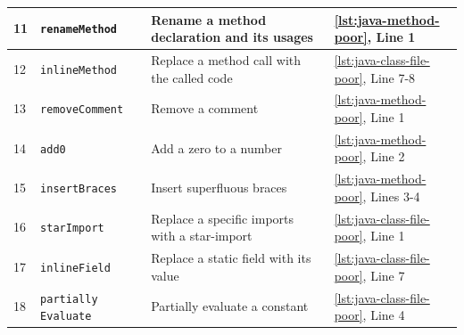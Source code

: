 \documentclass[%
class=scrreprt,
chapterprefix=false,%
open=right,%
twoside=true,%
paper=a4,%
logofile={Logo\_zentral\_farbig\_EN.png},%
thesistype=master,%
UKenglish,%
]{se2thesis}
\theoremstyle{definition}
\begin{document}
\begin{table}[p]
\begin{tabular}{|p{}|p{}|p{}|p{}|}
			\hline
			11 & \texttt{renameMethod} & Rename a method declaration and its usages & \autoref{lst:java-method-poor}, Line 1 \\
			\hline
			12 & \texttt{inlineMethod} & Replace a method call with the called code & \autoref{lst:java-class-file-poor}, Line 7-8 \\
			\hline
			13 & \texttt{removeComment} & Remove a comment & \autoref{lst:java-method-poor}, Line 1 \\
			\hline
			14 & \texttt{add0} & Add a zero to a number & \autoref{lst:java-method-poor}, Line 2 \\
			\hline
			15 & \texttt{insertBraces} & Insert superfluous braces & \autoref{lst:java-method-poor}, Lines 3-4 \\
			\hline
			16 & \texttt{starImport} & Replace a specific imports with a star-import & \autoref{lst:java-class-file-poor}, Line 1 \\
			\hline
			17 & \texttt{inlineField} & Replace a static field with its value & \autoref{lst:java-class-file-poor}, Line 7 \\
			\hline
			18 & \texttt{partially Evaluate} & Partially evaluate a constant & \autoref{lst:java-class-file-poor}, Line 4 \\
			\hline
		\end{tabular}
	\end{table}
	
\end{document}
